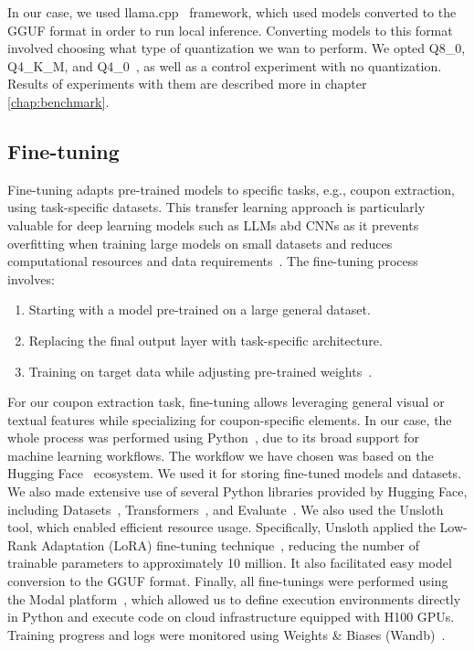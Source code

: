 \documentclass[licencjacka,en]{pracamgr}
\begin{document}
In our case, we used llama.cpp~\cite{llama-cpp} framework, which used models converted to the GGUF format in order to run local inference. Converting models to this format involved choosing what type of quantization we wan to perform. We opted Q8\_0, Q4\_K\_M, and Q4\_0~\cite{llama-cpp-quantization}, as well as a control experiment with no quantization. Results of experiments with them are described more in chapter \ref{chap:benchmark}.

\subsection{Fine-tuning}
Fine-tuning adapts pre-trained models to specific tasks, e.g., coupon extraction, using task-specific datasets. This transfer learning approach is particularly valuable for deep learning models such as LLMs abd CNNs as it prevents overfitting when training large models on small datasets and reduces computational resources and data requirements~\cite{ibm_fine-tuning}. The fine-tuning process involves:
\begin{enumerate}
    \item Starting with a model pre-trained on a large general dataset.
    \item Replacing the final output layer with task-specific architecture.
    \item Training on target data while adjusting pre-trained weights~\cite{finetune_cool_image}.
\end{enumerate}

For our coupon extraction task, fine-tuning allows leveraging general visual or textual features while specializing for coupon-specific elements. In our case, the whole process was performed using Python~\cite{python}, due to its broad support for machine learning workflows. The workflow we have chosen was based on the Hugging Face~\cite{hugging-face} ecosystem. We used it for storing fine-tuned models and datasets. We also made extensive use of several Python libraries provided by Hugging Face, including Datasets~\cite{lhoest2021datasetscommunitylibrarynatural}, Transformers~\cite{wolf-etal-2020-transformers}, and Evaluate~\cite{evaluate}. We also used the Unsloth~\cite{unsloth} tool, which enabled efficient resource usage. Specifically, Unsloth applied the Low-Rank Adaptation (LoRA) fine-tuning technique~\cite{hu2021loralowrankadaptationlarge}, reducing the number of trainable parameters to approximately 10 million. It also facilitated easy model conversion to the GGUF format. Finally, all fine-tunings were performed using the Modal platform~\cite{modal}, which allowed us to define execution environments directly in Python and execute code on cloud infrastructure equipped with H100 GPUs. Training progress and logs were monitored using Weights \& Biases (Wandb)~\cite{wandb}.
\end{document}
